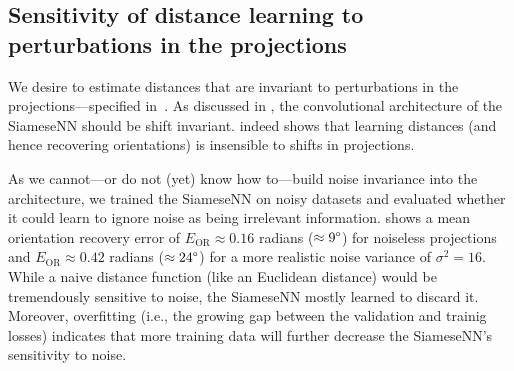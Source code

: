 
\subsection{Sensitivity of distance learning to perturbations in the projections}\label{sec:results:distance-estimation:sensitivity}


We desire to estimate distances that are invariant to perturbations in the projections---specified in~.
As discussed in , the convolutional architecture of the SiameseNN should be shift invariant.
 indeed shows that learning distances (and hence recovering orientations) is insensible to shifts in projections.

As we cannot---or do not (yet) know how to---build noise invariance into the architecture, we trained the SiameseNN on noisy datasets and evaluated whether it could learn to ignore noise as being irrelevant information.
 shows a mean orientation recovery error of $E_\text{OR} \approx 0.16$ radians ($\approx 9\degree$) for noiseless projections and $E_\text{OR} \approx 0.42$ radians ($\approx 24\degree$) for a more realistic noise variance of $\sigma^2=16$.
While a naive distance function (like an Euclidean distance) would be tremendously sensitive to noise, the SiameseNN mostly learned to discard it.
Moreover, overfitting (i.e., the growing gap between the validation and trainig losses) indicates that more training data will further decrease the SiameseNN's sensitivity to noise.

